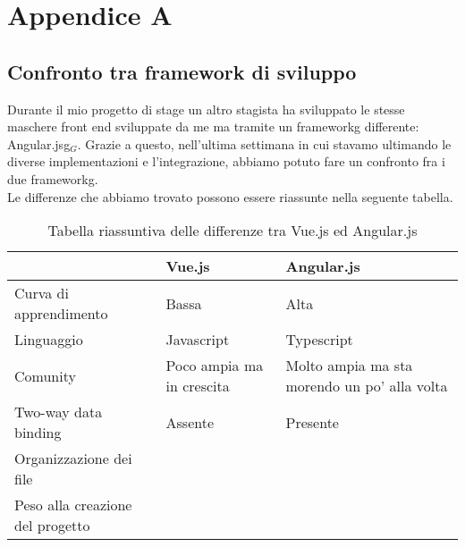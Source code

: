 
\chapter{Appendice A}

\section{Confronto tra framework di sviluppo}

Durante il mio progetto di stage un altro stagista ha sviluppato le stesse maschere front end sviluppate da me ma tramite un \gls{frameworkg} differente: \gls{Angular.jsg}$_G$. Grazie a questo, nell'ultima settimana in cui stavamo ultimando le diverse implementazioni e l'integrazione, abbiamo potuto fare un confronto fra i due \gls{frameworkg}.\\
Le differenze che abbiamo trovato possono essere riassunte nella seguente tabella.

\begin{table}[H]
	\caption{Tabella riassuntiva delle differenze tra Vue.js ed Angular.js}
	\label{tab:confronto-framework}
	\renewcommand{\arraystretch}{1.6}
	\begin{tabularx}{\textwidth}{lX|X}
		\hline\hline
		\textbf{} & \textbf{Vue.js} & \textbf{Angular.js}\\
		\hline
		Curva di apprendimento & Bassa & Alta \\
		\hline
		Linguaggio & Javascript & Typescript \\
		\hline
		Comunity & Poco ampia ma in crescita & Molto ampia ma sta morendo un po' alla volta \\
		\hline
		Two-way data binding & Assente & Presente \\
		\hline
		Organizzazione dei file &  &  \\
		\hline
		Peso alla creazione del progetto &  &  \\
		\hline
	\end{tabularx}
\end{table}%



